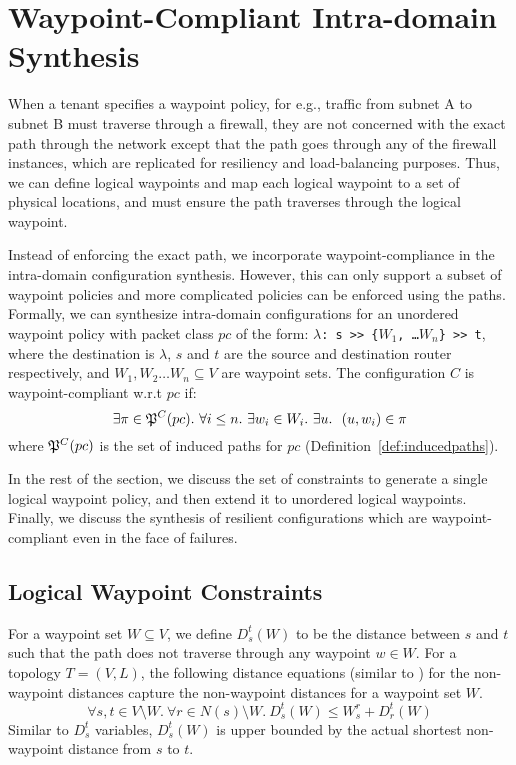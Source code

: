 \section{Waypoint-Compliant Intra-domain Synthesis}
When a tenant specifies a waypoint policy, for e.g., traffic from
subnet A to subnet B must traverse through a firewall, they are not
concerned with the exact path through the network except that the 
path goes through any of the firewall instances, which are replicated 
for resiliency and load-balancing purposes. Thus, we can define 
logical waypoints and map each logical waypoint to a set of physical
locations, and \name must ensure the path traverses through the logical waypoint.

Instead of enforcing the
exact \genesis path, we incorporate waypoint-compliance in the 
intra-domain configuration synthesis. However, this can only 
support a subset of waypoint policies and more complicated policies
can be enforced using the \genesis paths. 
Formally, we can synthesize intra-domain configurations
for an unordered waypoint policy with packet class $pc$ of the form: 
\texttt{$\lambda$: s >> \{$W_1$, \ldots $W_n$\} >> t},
where the destination is $\lambda$,  
$s$ and $t$ are the source and destination router respectively, 
and $W_1, W_2 \ldots W_n \subseteq V$ are waypoint sets.
The configuration $C$ is waypoint-compliant w.r.t $pc$ if: 
\[
\exists \pi \in \mathfrak{P}^C(pc). ~\forall i \leq n. ~\exists w_i \in W_i. 
~\exists u. ~~(u, w_i) \in \pi 
\]
where $\mathfrak{P}^C(pc)$ is the set of induced paths for 
$pc$ (Definition~\ref{def:inducedpaths}). 

In the rest of the section, we discuss the set of constraints
to generate a single logical waypoint policy, and then extend it 
to unordered logical waypoints. Finally, we discuss the synthesis
of resilient configurations which are waypoint-compliant even in 
the face of failures. 

\subsection{Logical Waypoint Constraints}
For a waypoint set $W \subseteq V$, we define $D_s^t(W)$ to be the 
distance between $s$ and $t$ such that the path does not
 traverse through any waypoint $w \in W$. For a topology 
 $T = (V,L)$, the following distance equations (similar to 
 ) for the non-waypoint distances capture the
 non-waypoint distances for a waypoint set $W$.
\begin{equation} \label{eq:dist}
\forall s, t \in V \setminus W. ~\forall r \in N(s) \setminus W.~
D_s^t(W) \leq W_s^r + D_r^t(W)
\end{equation}
Similar to $D_s^t$ variables, $D_s^t(W)$ is upper bounded by the
actual shortest non-waypoint distance from $s$ to $t$.

